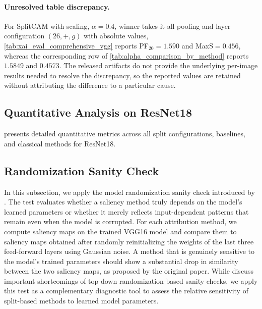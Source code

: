 \paragraph{Unresolved table discrepancy.}
For SplitCAM with scaling, $\alpha=0.4$, winner-takes-it-all pooling and layer configuration
$(26,+,g)$ with absolute values, \cref{tab:xai_eval_comprehensive_vgg} reports
PF$_{20}=1.590$ and MaxS$=0.456$, whereas the corresponding row of
\cref{tab:alpha_comparison_by_method} reports $1.5849$ and $0.4573$. The released artifacts do not
provide the underlying per-image results needed to resolve the discrepancy, so the reported
values are retained without attributing the difference to a particular cause.



\subsection{Quantitative Analysis on ResNet18} \label{app:resnet_split}

 presents detailed quantitative metrics across all split configurations, baselines, and classical methods for ResNet18.



\subsection{Randomization Sanity Check} \label{app:sanity}

In this subsection, we apply the model randomization sanity check introduced by . 
The test evaluates whether a saliency method truly depends on the model’s learned parameters 
or whether it merely reflects input-dependent patterns that remain even when the model is corrupted.
For each attribution method, we compute saliency maps on the trained VGG16 model and compare them 
to saliency maps obtained after randomly reinitializing the weights of the last three feed-forward 
layers using Gaussian noise. A method that is genuinely sensitive to the model's trained parameters should show a substantial
drop in similarity between the two saliency maps, as proposed by the original paper.
While  discuss important shortcomings of top-down randomization-based sanity checks, we apply this test as a complementary diagnostic tool to assess the relative sensitivity of split-based methods to learned model parameters.

